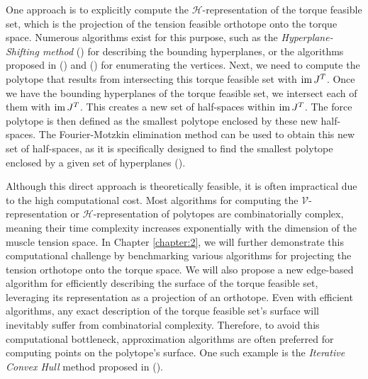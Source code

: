 One approach is to explicitly compute the $\mathcal{H}$-representation of the torque feasible set, which is the projection of the tension feasible orthotope onto the torque space. Numerous algorithms exist for this purpose, such as the \emph{Hyperplane-Shifting method} (\cite{gouttefardeCharacterizationParallelManipulator2010a}) for describing the bounding hyperplanes, or the algorithms proposed in (\cite{radaNewAlgorithmEnumeration2018}) and (\cite{guCounterfactualIdentificationLatent2022}) for enumerating the vertices. Next, we need to compute the polytope that results from intersecting this torque feasible set with $\operatorname{im}{J^T}$. Once we have the bounding hyperplanes of the torque feasible set, we intersect each of them with $\operatorname{im}{J^T}$. This creates a new set of half-spaces within $\operatorname{im}{J^T}$. The force polytope is then defined as the smallest polytope enclosed by these new half-spaces. The Fourier-Motzkin elimination method can be used to obtain this new set of half-spaces, as it is specifically designed to find the smallest polytope enclosed by a given set of hyperplanes (\cite{dahlCombinatorialPropertiesFourierMotzkin2007}).

Although this direct approach is theoretically feasible, it is often impractical due to the high computational cost. Most algorithms for computing the $\mathcal{V}$-representation or $\mathcal{H}$-representation of polytopes are combinatorially complex, meaning their time complexity increases exponentially with the dimension of the muscle tension space. In Chapter \ref{chapter:2}, we will further demonstrate this computational challenge by benchmarking various algorithms for projecting the tension orthotope onto the torque space. We will also propose a new edge-based algorithm for efficiently describing the surface of the torque feasible set, leveraging its representation as a projection of an orthotope. Even with efficient algorithms, any exact description of the torque feasible set's surface will inevitably suffer from combinatorial complexity. Therefore, to avoid this computational bottleneck, approximation algorithms are often preferred for computing points on the polytope's surface. One such example is the \emph{Iterative Convex Hull} method proposed in (\cite{skuricOnLineFeasibleWrench2022}).

